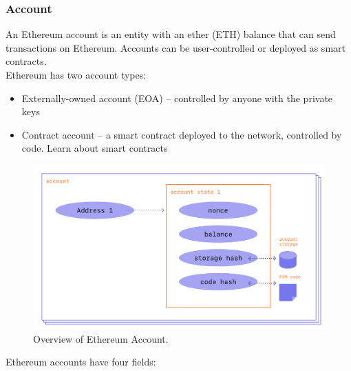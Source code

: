 \documentclass{article}
\begin{document}
\subsubsection{Account}
An Ethereum account is an entity with an ether (ETH) balance that can send transactions on Ethereum. Accounts can be user-controlled or deployed as smart contracts.\\
Ethereum has two account types:
\begin{itemize}
    \item Externally-owned account (EOA) – controlled by anyone with the private keys
    \item Contract account – a smart contract deployed to the network, controlled by code. Learn about smart contracts
\end{itemize}
\begin{figure}[h]
\centering
\includegraphics[width=1\textwidth]{account.png}
\caption{\label{fig:account}Overview of Ethereum Account.}
\end{figure}
Ethereum accounts have four fields:
\end{document}
